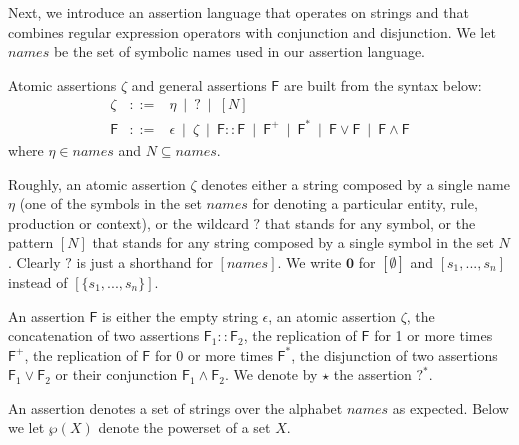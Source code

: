 Next, we introduce an assertion language that operates on strings
and that combines regular expression operators with conjunction and disjunction.
We let $\mathit{names}$ be the set of symbolic names used in our assertion language.

\begin{definition}
\label{def:assetionl}
Atomic assertions $\zeta$ and general assertions $\mathsf{F}$ are built from the syntax below: 
$$
\begin{array}{lcl}
\zeta & ::= & 
\eta ~\mid ~ 
? ~\mid ~ 
[N]
\\
\mathsf{F} & ::= & 
\epsilon ~\mid ~ 
\zeta ~\mid ~ 
\mathsf{F}::\mathsf{F} ~\mid ~ 
\mathsf{F}^+ ~\mid ~ 
\mathsf{F}^* ~\mid ~ 
\mathsf{F} \vee \mathsf{F} ~\mid ~ 
\mathsf{F} \wedge \mathsf{F}
\end{array}
$$
where $\eta \in \mathit{names}$ and $N\subseteq \mathit{names}$.
\end{definition}

Roughly, an atomic assertion $\zeta$ denotes either a string composed by a single name $\eta$ (one of the symbols in the set $\mathit{names}$ for denoting a particular entity, rule, production or context), or
the wildcard $?$ that stands for any symbol, or the pattern $[N]$ that stands for any string composed by a single symbol in the set $N$. Clearly $?$  is just a shorthand for $[\mathit{names}]$.
We write $\mathbf{0}$ for $[\emptyset]$ and $[s_1,...,s_n]$ instead of $[\{s_1,...,s_n\}]$. 

An assertion $\mathsf{F}$ is either the empty string $\epsilon$, an atomic assertion $\zeta$, the concatenation of two assertions $\mathsf{F}_1::\mathsf{F}_2$, the replication of $\mathsf{F}$ for 1 or more times $\mathsf{F}^+$, the replication of $\mathsf{F}$ for 0 or more times $\mathsf{F}^*$, the disjunction of two assertions $\mathsf{F}_1 \vee \mathsf{F}_2$ or their conjunction $\mathsf{F}_1 \wedge \mathsf{F}_2$. We denote by $\star$ the assertion $?^*$.

An assertion denotes a set of strings over the alphabet $\mathit{names}$ as expected.
Below we let $\wp(X)$ denote the powerset of a set $X$.

